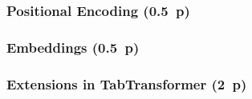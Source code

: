 
\subsubsection{Positional Encoding (0.5~p)}\label{sec:positional-encoding}

\subsubsection{Embeddings (0.5~p)}\label{sec:embeddings}

\subsubsection{Extensions in
  TabTransformer (2~p)}\label{sec:extensions-in-tabtransformer}

